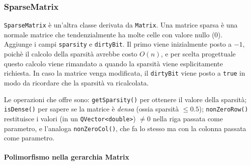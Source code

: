 \subsubsection{SparseMatrix}
\texttt{SparseMatrix} è un'altra classe derivata da \texttt{Matrix}. Una matrice sparsa è una normale matrice
che tendenzialmente ha molte celle con valore nullo (0). Aggiunge i campi \texttt{sparsity} e 
\texttt{dirtyBit}. Il primo viene inizialmente posto a $-1$, poichè il calcolo della sparsità avrebbe costo $O(n)$,
e per scelta progettuale questo calcolo viene rimandato a quando la sparsità viene esplicitamente richiesta. 
In caso la matrice venga modificata, il \texttt{dirtyBit} viene posto a \texttt{true} in modo da ricordare che
la sparsità va ricalcolata.\par
Le operazioni che offre sono: \texttt{getSparsity()} per ottenere il valore della sparsità; \texttt{isDense()}
per sapere se la matrice è \emph{densa} (ossia sparsità $\leq 0.5$); \texttt{nonZeroRow()} restituisce i valori
(in un \texttt{QVector<double>}) $\neq 0$ nella riga passata come parametro, e l'analoga \texttt{nonZeroCol()},
che fa lo stesso ma con la colonna passata come parametro.

\paragraph*{Polimorfismo nella gerarchia Matrix}

